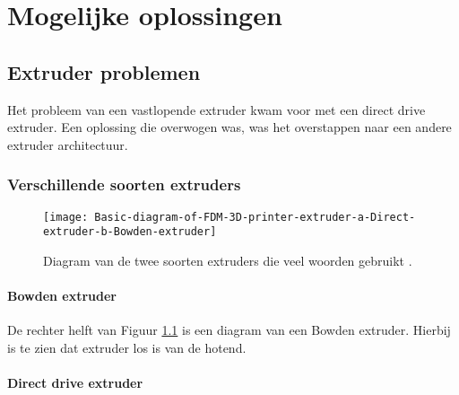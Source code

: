 \chapter{Mogelijke oplossingen}
\label{Mogelijke_oplossingen}

\section{Extruder problemen}

Het probleem van een vastlopende extruder kwam voor met een direct drive
extruder. Een oplossing die overwogen was, was het overstappen naar een andere
extruder architectuur.

\subsection{Verschillende soorten extruders}

\begin{figure}[h]
    \centerline{\texttt{[image: Basic-diagram-of-FDM-3D-printer-extruder-a-Direct-extruder-b-Bowden-extruder]}}
    \caption{Diagram van de twee soorten extruders die veel woorden gebruikt \cite{soorten_extruders}.}
    \label{fig:soorten_extruders}
\end{figure}

\subsubsection{Bowden extruder}
\label{ss:Bowden_extruder}

De rechter helft van Figuur \ref{fig:soorten_extruders} \cite{soorten_extruders}
is een diagram van een Bowden extruder. Hierbij is te zien dat \ac{extruder} los
is van de \ac{hotend}.


\subsubsection{Direct drive extruder}
\label{ss:direct_drive_extruder}

